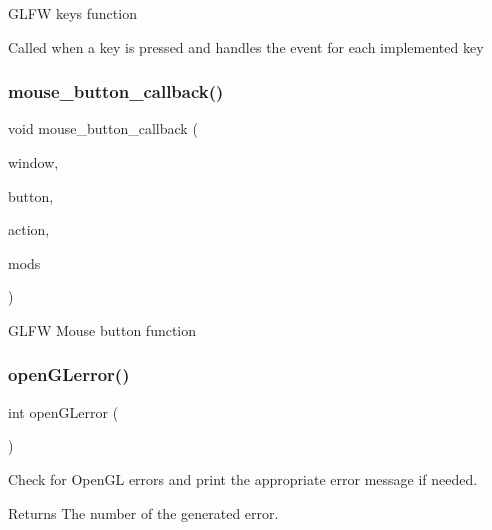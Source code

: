 G\+L\+FW keys function

Called when a key is pressed and handles the event for each implemented key \mbox{\label{Window-Management_8cpp_a5515d805e76ce6728de3c0dc5e187c86}} 
\subsubsection{\texorpdfstring{mouse\+\_\+button\+\_\+callback()}{mouse\_button\_callback()}}
{\footnotesize\ttfamily void mouse\+\_\+button\+\_\+callback (\begin{DoxyParamCaption}\item[{G\+L\+F\+Wwindow $\ast$}]{window,  }\item[{int}]{button,  }\item[{int}]{action,  }\item[{int}]{mods }\end{DoxyParamCaption})}

G\+L\+FW Mouse button function \mbox{\label{Window-Management_8cpp_a2008ec7e2e49a51a3d3f0091cf96bc55}} 
\subsubsection{\texorpdfstring{open\+G\+Lerror()}{openGLerror()}}
{\footnotesize\ttfamily int open\+G\+Lerror (\begin{DoxyParamCaption}{ }\end{DoxyParamCaption})}

Check for Open\+GL errors and print the appropriate error message if needed.

\begin{DoxyReturn}{Returns}
The number of the generated error. 
\end{DoxyReturn}
